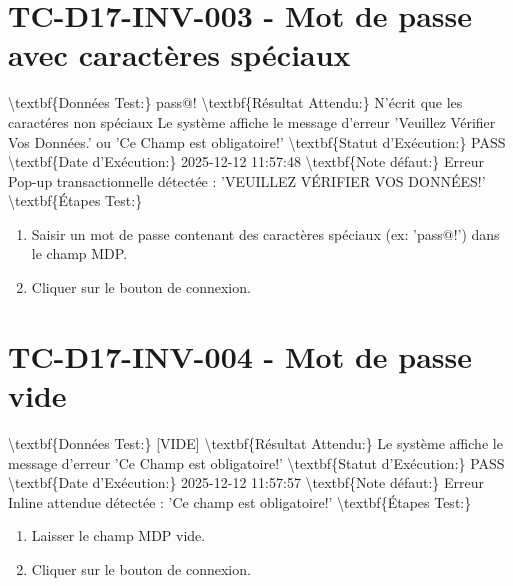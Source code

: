 \documentclass{article}%
\begin{document}
\section{TC{-}D17{-}INV{-}003 {-} Mot de passe avec caractères spéciaux}%
\label{sec:TC{-}D17{-}INV{-}003{-}Motdepasseaveccaractresspciaux}%
\textbackslash{}textbf\{Données Test:\} pass@!\newline%
\newline%
%
\textbackslash{}textbf\{Résultat Attendu:\} N'écrit que les caractéres non spéciaux Le système affiche le message d'erreur 'Veuillez Vérifier Vos Données.' ou 'Ce Champ est obligatoire!'\newline%
\newline%
%
\textbackslash{}textbf\{Statut d'Exécution:\} PASS\newline%
\newline%
%
\textbackslash{}textbf\{Date d'Exécution:\} 2025{-}12{-}12 11:57:48\newline%
\newline%
%
\textbackslash{}textbf\{Note défaut:\} Erreur Pop{-}up transactionnelle détectée : 'VEUILLEZ VÉRIFIER VOS DONNÉES!'\newline%
\newline%
%
\textbackslash{}textbf\{Étapes Test:\}\newline%
%
\begin{enumerate}%
\item%
Saisir un mot de passe contenant des caractères spéciaux (ex: 'pass@!') dans le champ MDP.%
\item%
Cliquer sur le bouton de connexion.%
\end{enumerate}

%
\section{TC{-}D17{-}INV{-}004 {-} Mot de passe vide}%
\label{sec:TC{-}D17{-}INV{-}004{-}Motdepassevide}%
\textbackslash{}textbf\{Données Test:\} {[}VIDE{]}\newline%
\newline%
%
\textbackslash{}textbf\{Résultat Attendu:\} Le système affiche le message d'erreur 'Ce Champ est obligatoire!'\newline%
\newline%
%
\textbackslash{}textbf\{Statut d'Exécution:\} PASS\newline%
\newline%
%
\textbackslash{}textbf\{Date d'Exécution:\} 2025{-}12{-}12 11:57:57\newline%
\newline%
%
\textbackslash{}textbf\{Note défaut:\} Erreur Inline attendue détectée : 'Ce champ est obligatoire!'\newline%
\newline%
%
\textbackslash{}textbf\{Étapes Test:\}\newline%
%
\begin{enumerate}%
\item%
Laisser le champ MDP vide.%
\item%
Cliquer sur le bouton de connexion.%
\end{enumerate}

%
\end{document}
